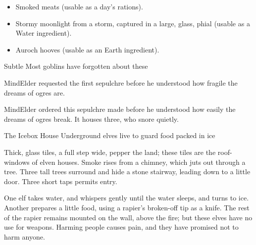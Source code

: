 \begin{multicols}{2}
\begin{itemize}
  \item
  Smoked meats (usable as a day's \glspl{ration}).
  \item
  Stormy moonlight from a storm, captured in a large, glass, phial (usable as a Water \gls{ingredient}).
  \item
  Auroch hooves (usable as an Earth \gls{ingredient}).
\end{itemize}



%

{Subtle }%
{Most goblins have forgotten about these }%

\begin{exampletext}
  \Gls{MindElder} requested the first \gls{sepulchre} before he understood how fragile the dreams of \glspl{ogre} are.
\end{exampletext}
\Gls{MindElder} ordered this \gls{sepulchre} made before he understood how easily the dreams of \glspl{ogre} break.
It houses three, who snore quietly.

{The Icebox House}%
{Underground elves live to guard food packed in ice}%
\label{iceboxHouse}


Thick, glass tiles, a full step wide, pepper the land; these tiles are the roof-windows of elven houses.%
Smoke rises from a chimney, which juts out through a tree.
Three tall trees surround and hide a stone stairway, leading down to a little door.
Three short taps permits entry.

\begin{boxtext}
  One elf takes water, and whispers gently until the water sleeps, and turns to ice.
  Another prepares a little food, using a rapier's broken-off tip as a knife.
  The rest of the rapier remains mounted on the wall, above the fire; but these elves have no use for weapons.
  Harming people causes pain, and they have promised not to harm anyone.
\end{boxtext}


\end{multicols}

